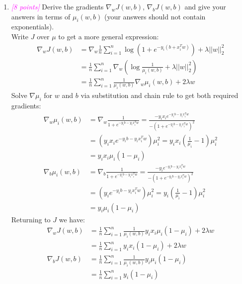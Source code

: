 \documentclass{article}
\newcommand{\1}{\mathbf{1}}
\newcommand{\points}[1]{\small\textcolor{magenta}{\emph{[#1 points]}} \normalsize}
\begin{document}
\begin{enumerate}
    \item \points{8} Derive the gradients $\nabla_wJ(w,b)$, $\nabla_bJ(w,b)$ and give your answers in terms of $\mu_i(w,b)$  (your answers should not contain exponentials). \\
    Write $J$ over $\mu$ to get a more general expression:
    \begin{align*}
        \nabla_w J(w,b) &= \nabla_w \frac{1}{n} \sum_{i=1}^n \log{\left( 1 + e^{-y_i(b+x^T_iw)} \right)} + \lambda||w||^2_2 \\
        &= \frac{1}{n} \sum_{i=1}^n \nabla_w \left(\log{\frac{1}{\mu_i(w,b)}} + \lambda||w||^2_2\right) \\
        &= \frac{1}{n} \sum_{i=1}^n \frac{1}{\mu_i(w,b)} \nabla_w \mu_i(w,b) + 2\lambda w
    \end{align*}{}
    Solve $\nabla \mu_i$ for $w$ and $b$ via substitution and chain rule to get both required gradients:
    \begin{align*}
        \nabla_w \mu_i(w,b) &= \nabla_w \frac{1}{1+e^{-y_ib-y_ix^T_iw}} = \frac{-y_ix_i e^{-y_ib - y_ix^T_iw}}{-\left(1+e^{-y_ib - y_ix^T_iw}\right)^2} \\
        & = \left(y_ix_i e^{-y_ib - y_ix^T_iw} \right)\mu_i^2 = y_i x_i \left(\frac{1}{\mu_i} -1 \right)\mu_i^2 \\
        & = y_ix_i \mu_i(1-\mu_i)\\
        \nabla_b \mu_i(w,b) &= \nabla_b \frac{1}{1+e^{-y_ib-y_ix^T_iw}} = \frac{-y_i e^{-y_ib - y_ix^T_iw}}{-\left(1+e^{-y_ib - y_ix^T_iw}\right)^2} \\
        & = \left(y_i e^{-y_ib - y_ix^T_iw} \right)\mu_i^2 = y_i \left(\frac{1}{\mu_i} -1 \right)\mu_i^2 \\
        & = y_i \mu_i(1-\mu_i)
    \end{align*}{}
    Returning to $J$ we have:
    \begin{align*}
        \nabla_w J(w,b) &= \frac{1}{n} \sum_{i=1}^n \frac{1}{\mu_i(w,b)} y_ix_i \mu_i(1-\mu_i) + 2\lambda w \\
        & = \frac{1}{n} \sum_{i=1}^n y_ix_i (1-\mu_i) + 2\lambda w \\
        \nabla_b J(w,b) &= \frac{1}{n} \sum_{i=1}^n \frac{1}{\mu_i(w,b)} y_i \mu_i(1-\mu_i) \\
        & = \frac{1}{n} \sum_{i=1}^n y_i (1-\mu_i)
    \end{align*}{}
    

\end{enumerate}
\end{document}
